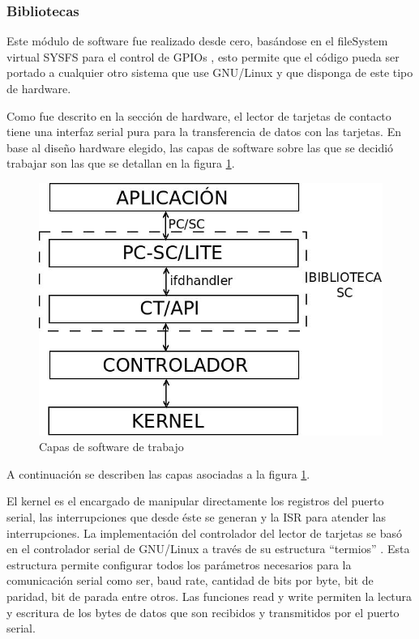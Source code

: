 \documentclass[%
        final,
        notitlepage,
        narroweqnarray,
        inline,
        ]{ieee}
\begin{document}
\subsubsection{Bibliotecas}


Este módulo de software fue realizado desde cero, basándose en el fileSystem virtual SYSFS para el control de GPIOs \cite{gpio} \cite{gpioK}, esto permite que el código pueda ser portado a cualquier otro sistema que use GNU/Linux y que disponga de este tipo de hardware.

\bigskip
{}

Como fue descrito en la sección de hardware, el lector de tarjetas de contacto tiene una interfaz serial pura para la transferencia de datos con las tarjetas. En base al diseño hardware elegido, las capas de software sobre las que se decidió trabajar son las que se detallan en la figura \ref{Fig:capas}. 

\begin{figure}[h]
\centering
  \begin{center}
  \includegraphics[scale=.35]{../docs/Imagenes/SW_sc1.jpg} 
  \end{center}
  \caption{Capas de software de trabajo}\label{Fig:capas} 
\end{figure}


A continuación se describen las capas asociadas a la figura \ref{Fig:capas}.


El kernel es el encargado de manipular directamente los registros del puerto serial, las interrupciones que desde éste se generan y la ISR para atender las interrupciones.
La implementación del controlador del lector de tarjetas se basó en el controlador serial de GNU/Linux a través de su estructura “termios” \cite{termios}. Esta estructura permite configurar todos los parámetros necesarios para la comunicación serial como ser, baud rate, cantidad de bits por byte, bit de paridad, bit de parada entre otros. Las funciones read y write permiten la lectura y escritura de los bytes de datos que son recibidos y transmitidos por el puerto serial.
\end{document}
